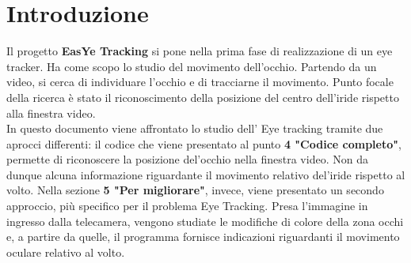 \documentclass[12pt]{article}
\begin{document}
\section{Introduzione}
Il progetto \textbf{EasYe Tracking} si pone nella prima fase di realizzazione di un eye tracker. Ha come scopo lo studio del movimento dell'occhio. Partendo da un video, si cerca di individuare l'occhio e di tracciarne il movimento. Punto focale della ricerca \`e stato il riconoscimento della posizione del centro dell'iride rispetto alla finestra video. 
\\In questo documento viene affrontato lo studio dell' Eye tracking tramite due aprocci differenti: il codice che viene presentato  al punto \textbf{4 "Codice completo"}, permette di riconoscere la posizione del'occhio nella finestra video. Non da dunque alcuna informazione riguardante il movimento relativo del'iride rispetto al volto.
Nella sezione \textbf{5 "Per migliorare"}, invece, viene presentato un secondo approccio, pi\`u specifico per il problema Eye Tracking. Presa l'immagine in ingresso dalla telecamera, vengono studiate le modifiche di colore della zona occhi e, a partire da quelle, il programma fornisce indicazioni riguardanti il movimento oculare relativo al volto.
\end{document}
